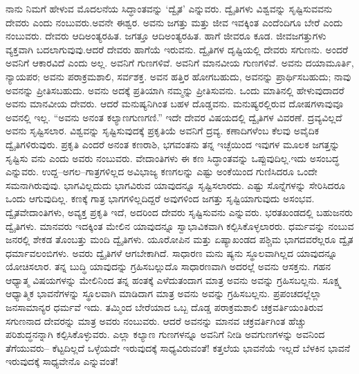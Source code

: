 ನಾನು ನಿಮಗೆ ಹೇಳುವ ಮೊದಲನೆಯ ಸಿದ್ಧಾಂತವನ್ನು ‘ದ್ವೈತ’ ಎನ್ನುವರು. ದ್ವೈತಿಗಳು ವಿಶ್ವವನ್ನು ಸೃಷ್ಟಿಸುವವನು ದೇವರು ಎಂದು ನಂಬುವರು.ಅವನೇ ಈಶ್ವರ. ಅವನು ಜಗತ್ತು ಮತ್ತು ಜೀವ ಇವಕ್ಕಿಂತ ಎಂದೆಂದಿಗೂ ಬೇರೆ ಎಂದು ನಂಬುವರು. ದೇವರು ಆದಿಅಂತ್ಯರಹಿತ. ಜಗತ್ತೂ ಆದಿಅಂತ್ಯರಹಿತ. ಹಾಗೆ ಜೀವರೂ ಕೂಡ. ಜೀವಜಗತ್ತುಗಳು ವ್ಯಕ್ತವಾಗಿ ಬದಲಾಗುವುವು.ಆದರೆ ದೇವರು ಹಾಗೆಯೆ ಇರುವನು. ದ್ವೈತಿಗಳ ದೃಷ್ಟಿಯಲ್ಲಿ ದೇವರು ಸಗುಣನು. ಅಂದರೆ ಅವನಿಗೆ ಆಕಾರವಿದೆ ಎಂದು ಅಲ್ಲ. ಅವನಿಗೆ ಗುಣಗಳಿವೆ. ಅವನಿಗೆ ಮಾನವೀಯ ಗುಣಗಳಿವೆ. ಅವನು ದಯಾಮೂರ್ತಿ, ನ್ಯಾಯಪರ; ಅವನು ಪರಾಕ್ರಮಶಾಲಿ, ಸರ್ವಶಕ್ತ. ಅವನ ಹತ್ತಿರ ಹೋಗಬಹುದು, ಅವನನ್ನು ಪ್ರಾರ್ಥಿಸಬಹುದು; ನಾವು ಅವನನ್ನು ಪ್ರೀತಿಸಬಹುದು. ಅವನು ಅದಕ್ಕೆ ಪ್ರತಿಯಾಗಿ ನಮ್ಮನ್ನು ಪ್ರೀತಿಸುವನು. ಒಂದು ಮಾತಿನಲ್ಲಿ ಹೇಳುವುದಾದರೆ ಅವನು ಮಾನವೀಯ ದೇವರು. ಆದರೆ ಮನುಷ್ಯನಿಗಿಂತ ಬಹಳ ದೊಡ್ಡವನು. ಮನುಷ್ಯರಲ್ಲಿರುವ ದೋಷಗಳಾವುವೂ ಅವನಲ್ಲಿ ಇಲ್ಲ. “ಅವನು ಅನಂತ ಕಲ್ಯಾಣಗುಣಗಣಿ.” ಇದೇ ದೇವರ ವಿಷಯದಲ್ಲಿ ದ್ವೈತಿಗಳ ವಿವರಣೆ. ದ್ರವ್ಯವಿಲ್ಲದೆ ಅವನು ಸೃಷ್ಟಿಸಲಾರ. ವಿಶ್ವವನ್ನು ಸೃಷ್ಟಿಸುವುದಕ್ಕೆ ಪ್ರಕೃತಿಯೆ ಅವನಿಗೆ ದ್ರವ್ಯ. ಕಣಾದಿಗಳೆಂಬ ಕೆಲವು ಅವೈದಿಕ ದ್ವೈತಿಗಳಿರುವುರು. ಪ್ರಕೃತಿ ಎಂದರೆ ಅನಂತ ಕಣರಾಶಿ, ಭಗವಂತನು ತನ್ನ ಇಚ್ಛೆಯಿಂದ ಇವುಗಳ ಮೂಲಕ ಜಗತ್ತನ್ನು ಸೃಷ್ಟಿಸು ವನು ಎಂದು ಅವರು ನಂಬುವರು. ವೇದಾಂತಿಗಳು ಈ ಕಣ ಸಿದ್ಧಾಂತವನ್ನು ಒಪ್ಪುವುದಿಲ್ಲ.ಇದು ಅಸಂಬದ್ಧ ಎನ್ನುವರು. ಉದ್ದ–ಅಗಲ–ಗಾತ್ರಗಳಿಲ್ಲದ ಅವಿಭಾಜ್ಯ ಕಣಗಲನ್ನು ಎಷ್ಟು ಅಂಕೆಯಿಂದ ಗುಣಿಸಿದರೂ ಒಂದೇ ಸಮನಾಗಿರುವುವು. ಭಾಗವಿಲ್ಲದುದು ಭಾಗವಿರುವ ಯಾವುದನ್ನೂ ಸೃಷ್ಟಿಸಲಾರದು. ಎಷ್ಟು ಸೊನ್ನೆಗಳನ್ನು ಸೇರಿಸಿದರೂ ಒಂದು ಆಗುವುದಿಲ್ಲ. ಕಣಕ್ಕೆ ಗಾತ್ರ ಭಾಗಗಳಿಲ್ಲದಿದ್ದರೆ ಅವುಗಳಿಂದ ಜಗತ್ತು ಸೃಷ್ಟಿಯಾಗುವುದು ಅಸಂಭವ. ದ್ವೈತವೇದಾಂತಿಗಳು, ಅವ್ಯಕ್ತ ಪ್ರಕೃತಿ ಇದೆ, ಅದರಿಂದ ದೇವರು ಸೃಷ್ಟಿಸುವನು ಎನ್ನುವರು. ಭರತಖಂಡದಲ್ಲಿ ಬಹುಜನರು ದ್ವೈತಿಗಳು. ಮಾನವರು ಇದಕ್ಕಿಂತ ಮೇಲಿನ ಯಾವುದನ್ನೂ ಸ್ವಾಭಾವಿಕವಾಗಿ ಕಲ್ಪಿಸಿಕೊಳ್ಳಲಾರರು. ಧರ್ಮವನ್ನು ನಂಬುವ ಜನರಲ್ಲಿ ಶೇಕಡ ತೊಂಬತ್ತು ಮಂದಿ ದ್ವೈತಿಗಳು. ಯೂರೋಪಿನ ಮತ್ತು ಏಷ್ಯಾಖಂಡದ ಪಶ್ಚಿಮ ಭಾಗದವರೆಲ್ಲರೂ ದ್ವೈತ ಧರ್ಮಾವಲಂಬಿಗಳು. ಅವರು ದ್ವೈತಿಗಳೆ ಆಗಬೇಕಾಗಿದೆ. ಸಾಧಾರಣ ಮನು ಷ್ಯನು ಸ್ಥೂಲವಾಗಿಲ್ಲದ ಯಾವುದನ್ನೂ ಯೋಚಿಸಲಾರ. ತನ್ನ ಬುದ್ಧಿ ಯಾವುದನ್ನು ಗ್ರಹಿಸಬಲ್ಲುದೊ ಸಾಧಾರಣವಾಗಿ ಅದರಲ್ಲೆ ಅವನು ಆಸಕ್ತನು. ಗಹನ ಆಧ್ಯಾತ್ಮ ವಿಷಯಗಳನ್ನು ಮೇಲಿನಿಂದ ತನ್ನ ಹಂತಕ್ಕೆ ಎಳೆದುತಂದಾಗ ಮಾತ್ರ ಅವನು ಅವನ್ನು ಗ್ರಹಿಸಬಲ್ಲನು. ಸೂಕ್ಷ್ಮ ಆಧ್ಯಾತ್ಮಿಕ ಭಾವನೆಗಳನ್ನು ಸ್ಥೂಲವಾಗಿ ಮಾಡಿದಾಗ ಮಾತ್ರ ಅವನು ಅವನ್ನು ಗ್ರಹಿಸಬಲ್ಲನು. ಪ್ರಪಂಚದಲ್ಲೆಲ್ಲಾ ಜನಸಾಮಾನ್ಯರ ಧರ್ಮವೆ ಇದು. ತಮ್ಮಿಂದ ಬೇರೆಯಾದ ಒಬ್ಬ ದೊಡ್ಡ ಪರಾಕ್ರಮಶಾಲಿ ಚಕ್ರವರ್ತಿಯಂತಿರುವ ಸಗುಣನಾದ ದೇವರನ್ನು ಮಾತ್ರ ಅವರು ನಂಬುವರು. ಆದರೆ ಅವನನ್ನು ಮಾನವ ಚಕ್ರವರ್ತಿಗಿಂತ ಹೆಚ್ಚು ಪರಿಶುದ್ಧನನ್ನಾಗಿ ಕಲ್ಪಿಸಿಕೊಳ್ಳುವರು. ಎಲ್ಲಾ ಕಲ್ಯಾಣ ಗುಣಗಳನ್ನೂ ಅವನಿಗೆ ನೀಡಿ ಅವಗುಣಗಳನ್ನು ಅವನಿಂದ ತೆಗೆಯುವರು– ಕೆಟ್ಟದಿಲ್ಲದೆ ಒಳ್ಳೆಯದೇ ಇರುವುದಕ್ಕೆ ಸಾಧ್ಯವಿರುವಂತೆ! ಕತ್ತಲೆಯ ಭಾವನೆಯೆ ಇಲ್ಲದೆ ಬೆಳಕಿನ ಭಾವನೆ ಇರುವುದಕ್ಕೆ ಸಾಧ್ಯವೇನೊ ಎನ್ನುವಂತೆ!

